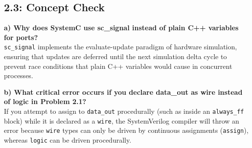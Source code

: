 \documentclass[11pt, letterpaper]{article}
\begin{document}
\pagebreak
\subsection*{2.3: Concept Check}
\textbf{a) Why does SystemC use sc\_signal instead of plain C++ variables for ports?}\\
\texttt{sc\_signal} implements the evaluate-update paradigm of hardware simulation, ensuring that updates are deferred until the next simulation delta cycle to prevent race conditions that plain C++ variables would cause in concurrent processes.

\vspace{1em}
\noindent
\textbf{b) What critical error occurs if you declare data\_out as wire instead of logic in Problem 2.1?}\\
If you attempt to assign to \texttt{data\_out} procedurally (such as inside an \texttt{always\_ff} block) while it is declared as a \texttt{wire}, the SystemVerilog compiler will throw an error because \texttt{wire} types can only be driven by continuous assignments (\texttt{assign}), whereas \texttt{logic} can be driven procedurally.
\end{document}
